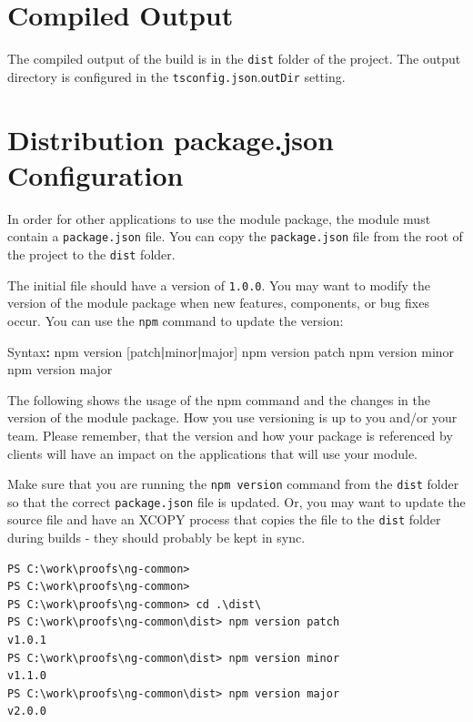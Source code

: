 \documentclass[]{book}
\newenvironment{Shaded}{\begin{snugshade}}{\end{snugshade}}
\newcommand{\OperatorTok}[1]{\textcolor[rgb]{0.81,0.36,0.00}{\textbf{#1}}}
\newcommand{\NormalTok}[1]{#1}
\theoremstyle{definition}
\theoremstyle{definition}
\theoremstyle{definition}
\theoremstyle{remark}
\begin{document}
\section{Compiled Output}\label{compiled-output}

The compiled output of the build is in the \texttt{dist} folder of the
project. The output directory is configured in the
\texttt{tsconfig.json}.\texttt{outDir} setting.

\section{Distribution package.json
Configuration}\label{distribution-package.json-configuration}

In order for other applications to use the module package, the module
must contain a \texttt{package.json} file. You can copy the
\texttt{package.json} file from the root of the project to the
\texttt{dist} folder.

The initial file should have a version of \texttt{1.0.0}. You may want
to modify the version of the module package when new features,
components, or bug fixes occur. You can use the \texttt{npm} command to
update the version:

\begin{Shaded}
\begin{Highlighting}[]
\NormalTok{Syntax}\OperatorTok{:}\NormalTok{ npm version [patch}\OperatorTok{|}\NormalTok{minor}\OperatorTok{|}\NormalTok{major]}
\NormalTok{npm version patch}
\NormalTok{npm version minor}
\NormalTok{npm version major}
\end{Highlighting}
\end{Shaded}

The following shows the usage of the npm command and the changes in the
version of the module package. How you use versioning is up to you
and/or your team. Please remember, that the version and how your package
is referenced by clients will have an impact on the applications that
will use your module.

Make sure that you are running the \texttt{npm\ version} command from
the \texttt{dist} folder so that the correct \texttt{package.json} file
is updated. Or, you may want to update the source file and have an XCOPY
process that copies the file to the \texttt{dist} folder during builds -
they should probably be kept in sync.

\begin{verbatim}
PS C:\work\proofs\ng-common>
PS C:\work\proofs\ng-common>
PS C:\work\proofs\ng-common> cd .\dist\
PS C:\work\proofs\ng-common\dist> npm version patch
v1.0.1
PS C:\work\proofs\ng-common\dist> npm version minor
v1.1.0
PS C:\work\proofs\ng-common\dist> npm version major
v2.0.0
\end{verbatim}
\end{document}

